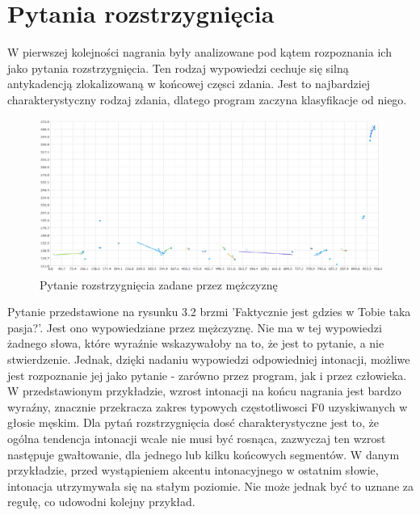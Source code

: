 \documentclass[a4paper,12 pt]{report}
\begin{document}
\section{Pytania rozstrzygnięcia}
W pierwszej kolejności nagrania były analizowane pod kątem rozpoznania ich jako pytania rozstrzygnięcia. Ten rodzaj wypowiedzi cechuje się silną antykadencją zlokalizowaną w końcowej częsci zdania.
Jest to najbardziej charakterystyczny rodzaj zdania, dlatego program zaczyna klasyfikacje od niego.
 \FloatBarrier
\begin{figure}[h]
\centering
\includegraphics[scale=0.75]{pytanie_rozstrzygniecia.pdf}
\caption{Pytanie rozstrzygnięcia zadane przez mężczyznę}
\end{figure}
\FloatBarrier
Pytanie przedstawione na rysunku 3.2 brzmi 'Faktycznie jest gdzies w Tobie taka pasja?'. Jest ono wypowiedziane przez mężczyznę. Nie ma w tej wypowiedzi żadnego słowa, które wyraźnie wskazywałoby na to, że jest to pytanie, a nie stwierdzenie. Jednak, dzięki nadaniu wypowiedzi odpowiedniej intonacji, możliwe jest rozpoznanie jej jako pytanie - zarówno przez program, jak i przez człowieka. W przedstawionym przykładzie, wzrost intonacji na końcu nagrania jest bardzo wyraźny, znacznie przekracza zakres typowych częstotliwosci F0 uzyskiwanych w głosie męskim. Dla pytań rozstrzygnięcia dosć charakterystyczne jest to, że ogólna tendencja intonacji wcale nie musi być rosnąca, zazwyczaj ten wzrost następuje gwałtowanie, dla jednego lub kilku końcowych segmentów. W danym przykładzie, przed wystąpieniem akcentu intonacyjnego w ostatnim słowie, intonacja utrzymywała się na stałym poziomie. Nie może jednak być to uznane za regułę, co udowodni kolejny przykład.
 \FloatBarrier
\end{document}
